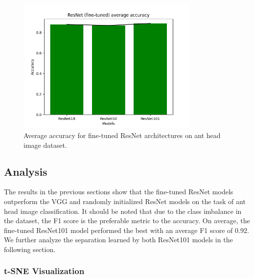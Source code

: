 \documentclass[12pt]{article}
\begin{document}
\begin{figure}[h]
    \centering
    \includegraphics[width=0.8\textwidth]{assets/plots/resnet_finetuned_average.png}
    \caption{Average accuracy for fine-tuned ResNet architectures on ant head image dataset.}
    \label{fig:fresnet_results}
\end{figure}

\clearpage
\subsection{Analysis}

The results in the previous sections show that the fine-tuned ResNet models
outperform the VGG and randomly initialized ResNet models on the task of ant
head image classification. It should be noted that due to the class imbalance in
the dataset, the F1 score is the preferable metric to the accuracy. On average,
the fine-tuned ResNet101 model performed the best with an average F1 score of
0.92. We further analyze the separation learned by both ResNet101 models in the
following section.

\subsubsection{t-SNE Visualization}
\end{document}
